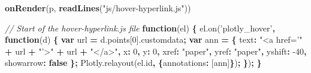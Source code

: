 \documentclass[
  12pt,
]{krantz}
\newenvironment{Shaded}{\begin{snugshade}}{\end{snugshade}}
\newcommand{\AttributeTok}[1]{\textcolor[rgb]{0.77,0.63,0.00}{#1}}
\newcommand{\CommentTok}[1]{\textcolor[rgb]{0.56,0.35,0.01}{\textit{#1}}}
\newcommand{\DataTypeTok}[1]{\textcolor[rgb]{0.13,0.29,0.53}{#1}}
\newcommand{\DecValTok}[1]{\textcolor[rgb]{0.00,0.00,0.81}{#1}}
\newcommand{\KeywordTok}[1]{\textcolor[rgb]{0.13,0.29,0.53}{\textbf{#1}}}
\newcommand{\NormalTok}[1]{#1}
\newcommand{\OperatorTok}[1]{\textcolor[rgb]{0.81,0.36,0.00}{\textbf{#1}}}
\newcommand{\StringTok}[1]{\textcolor[rgb]{0.31,0.60,0.02}{#1}}
\newcommand{\VariableTok}[1]{\textcolor[rgb]{0.00,0.00,0.00}{#1}}
\begin{document}
\begin{Shaded}
\begin{Highlighting}[]
\KeywordTok{onRender}\NormalTok{(p, }\KeywordTok{readLines}\NormalTok{(}\StringTok{"js/hover-hyperlink.js"}\NormalTok{))}
\end{Highlighting}
\end{Shaded}

\begin{Shaded}
\begin{Highlighting}[]
\CommentTok{// Start of the hover-hyperlink.js file}
\KeywordTok{function}\NormalTok{(el) }\OperatorTok{\{}
  \VariableTok{el}\NormalTok{.}\AttributeTok{on}\NormalTok{(}\StringTok{'plotly_hover'}\OperatorTok{,} \KeywordTok{function}\NormalTok{(d) }\OperatorTok{\{}
    \KeywordTok{var}\NormalTok{ url }\OperatorTok{=} \VariableTok{d}\NormalTok{.}\AttributeTok{points}\NormalTok{[}\DecValTok{0}\NormalTok{].}\AttributeTok{customdata}\OperatorTok{;}
    \KeywordTok{var}\NormalTok{ ann }\OperatorTok{=} \OperatorTok{\{}
      \DataTypeTok{text}\OperatorTok{:} \StringTok{"<a href='"} \OperatorTok{+}\NormalTok{ url }\OperatorTok{+} \StringTok{"'>"} \OperatorTok{+}\NormalTok{ url }\OperatorTok{+} \StringTok{"</a>"}\OperatorTok{,}
      \DataTypeTok{x}\OperatorTok{:} \DecValTok{0}\OperatorTok{,}
      \DataTypeTok{y}\OperatorTok{:} \DecValTok{0}\OperatorTok{,}
      \DataTypeTok{xref}\OperatorTok{:} \StringTok{"paper"}\OperatorTok{,}
      \DataTypeTok{yref}\OperatorTok{:} \StringTok{"paper"}\OperatorTok{,}
      \DataTypeTok{yshift}\OperatorTok{:} \DecValTok{-40}\OperatorTok{,}
      \DataTypeTok{showarrow}\OperatorTok{:} \KeywordTok{false}
    \OperatorTok{\};}
    \VariableTok{Plotly}\NormalTok{.}\AttributeTok{relayout}\NormalTok{(}\VariableTok{el}\NormalTok{.}\AttributeTok{id}\OperatorTok{,} \OperatorTok{\{}\DataTypeTok{annotations}\OperatorTok{:}\NormalTok{ [ann]}\OperatorTok{\}}\NormalTok{)}\OperatorTok{;}
 \OperatorTok{\}}\NormalTok{)}\OperatorTok{;}
\OperatorTok{\}}
\end{Highlighting}
\end{Shaded}
\end{document}
